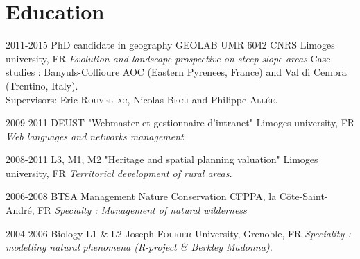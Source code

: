 \documentclass[]{cv-etienne}
\begin{document}
\section{Education}

\begin{entrylist}
\entry
{2011-2015}
{PhD candidate in geography {\normalfont GEOLAB UMR 6042 CNRS}}
{Limoges university, FR}
{\emph{Evolution and landscape prospective on steep slope areas} Case studies : Banyuls-Collioure AOC (Eastern Pyrenees, France) and Val di Cembra (Trentino, Italy). \\Supervisors: Eric \textsc{Rouvellac}, Nicolas \textsc{Becu} and Philippe \textsc{Allée}.}
\end{entrylist}

\begin{entrylist}
\entry
{2009-2011}
{DEUST {\normalfont "Webmaster et gestionnaire d’intranet"}}
{Limoges university, FR}
{\emph{Web languages and networks management}}
\end{entrylist}

\begin{entrylist}
\entry
{2008-2011}
{L3, M1, M2 {\normalfont "Heritage and spatial planning valuation"}}
{ Limoges university, FR}
{\emph{Territorial development of rural areas.}}
\end{entrylist}

\begin{entrylist}
\entry
{2006-2008}
{BTSA {\normalfont Management Nature Conservation}}
{ CFPPA, la Côte-Saint-André, FR}
{\emph{Specialty : Management of natural wilderness}}
\end{entrylist}

\begin{entrylist}
\entry
{2004-2006}
{Biology L1 \& L2}
{Joseph \textsc{Fourier} University, Grenoble, FR}
{\emph{Speciality : modelling natural phenomena (R-project \& Berkley Madonna).}}
\end{entrylist}
\end{document}
